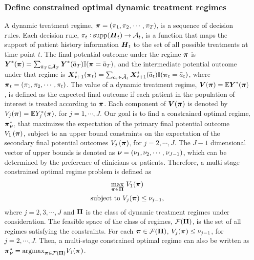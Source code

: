 \subsubsection{Define constrained optimal dynamic treatment regimes }
A dynamic treatment regime, $\boldsymbol{\pi} = (\pi_1, \pi_2, \cdots, \pi_T)$, is a sequence of decision rules. Each decision rule, $\pi_t : \text{supp}( \boldsymbol{H}_t ) \to \mathcal{A}_t$, is a function that maps the support of patient history information $\boldsymbol{H}_t$ to the set of all possible treatments at time point $t$. The final potential outcome under the regime $\boldsymbol{\pi}$ is $\boldsymbol{Y}^*(\boldsymbol{\pi}) = \sum_{\bar{a}_T \in \bar{\mathcal{A}}_T}\boldsymbol{Y}^*(\bar{a}_T)\mathbb{I}(\boldsymbol{\pi} = \bar{a}_T)$, and the intermediate potential outcome under that regime is $\boldsymbol{X}_{t+1}^*(\boldsymbol{\pi}_{t}) = \sum_{\bar{a}_t \in \bar{\mathcal{A}}_t}\boldsymbol{X}_{t+1}^*(\bar{a}_{t})\mathbb{I}(\boldsymbol{\pi}_t = \bar{a}_t)$, where $\boldsymbol{\pi}_t = (\pi_1, \pi_2, \cdots, \pi_t)$. The value of a dynamic treatment regime, $\boldsymbol{V}(\boldsymbol{\pi}) = \mathbb{E}\boldsymbol{Y}^*(\boldsymbol{\pi})$, is defined as the expected final outcome if each patient in the population of interest is treated according to $\boldsymbol{\pi}$. Each component of $\boldsymbol{V}(\boldsymbol{\pi})$ is denoted by $V_j(\boldsymbol{\pi}) = \mathbb{E}Y_j^*(\boldsymbol{\pi})$, for $j = 1, \cdots, J$. Our goal is to find a constrained optimal regime, $\boldsymbol{\pi}_{\boldsymbol{\nu}}^{*}$, that maximizes the expectation of the primary final potential outcome $V_1\left( \boldsymbol{\pi}\right) $, subject to an upper bound constraints on the expectation of the secondary final potential outcomes $V_j\left( \boldsymbol{\pi}\right)$, for $j=2 ,\cdots, J$.  The $J-1$ dimensional vector of upper bounds is denoted as $\boldsymbol{\nu} = (\nu_1, \nu_2, \cdots, \nu_{J-1})$, which can be determined by the preference of clinicians or patients.  Therefore, a multi-stage constrained optimal regime problem is defined as
\begin{equation}
\begin{gathered}
 \underset{\boldsymbol{\pi} \in \boldsymbol{\Pi}}{\text{max}} \,\,
 V_1( \boldsymbol{\pi} )  \\
  \text{subject to}  \,\, V_j( \boldsymbol{\pi} ) \le \nu_{j-1},
\end{gathered}
\end{equation}
where $j = 2, 3, \cdots, J$  and $\boldsymbol{\Pi}$ is the class of dynamic treatment regimes under consideration. The feasible space of the class of regimes, $\mathcal{F}(\boldsymbol{\Pi})$, is the set of all regimes satisfying the constraints. For each $\boldsymbol{\pi} \in \mathcal{F}(\boldsymbol{\Pi})$, $V_j(\boldsymbol{\pi}) \le \nu_{j-1}$, for $j = 2, \cdots, J$. Then, a multi-stage constrained optimal regime can also be written as $\boldsymbol{\pi}_{\boldsymbol{\nu}}^*= \text{argmax}_{{\boldsymbol{\pi} \in \mathcal{F}(\boldsymbol{\Pi})}}V_1 (\boldsymbol{\pi})$.\\

